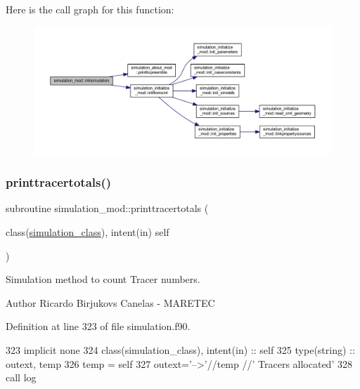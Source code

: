 Here is the call graph for this function\+:
\nopagebreak
\begin{figure}[H]
\begin{center}
\leavevmode
\includegraphics[width=350pt]{namespacesimulation__mod_aedbba2bb458cbcd7eb93938a5f7b5940_cgraph}
\end{center}
\end{figure}
\mbox{\label{namespacesimulation__mod_aba126a8e0575cabb3bef6ab395002b3c}} 
\subsubsection{\texorpdfstring{printtracertotals()}{printtracertotals()}}
{\footnotesize\ttfamily subroutine simulation\+\_\+mod\+::printtracertotals (\begin{DoxyParamCaption}\item[{class(\mbox{\hyperlink{structsimulation__mod_1_1simulation__class}{simulation\+\_\+class}}), intent(in)}]{self }\end{DoxyParamCaption})\hspace{0.3cm}{\ttfamily [private]}}



Simulation method to count Tracer numbers. 

\begin{DoxyAuthor}{Author}
Ricardo Birjukovs Canelas -\/ M\+A\+R\+E\+T\+EC 
\end{DoxyAuthor}


Definition at line 323 of file simulation.\+f90.


\begin{DoxyCode}
323     \textcolor{keywordtype}{implicit none}
324     \textcolor{keywordtype}{class}(simulation\_class), \textcolor{keywordtype}{intent(in)} :: self
325     \textcolor{keywordtype}{type}(string) :: outext, temp
326     temp = self%
327     outext=\textcolor{stringliteral}{'-->'}//temp //\textcolor{stringliteral}{' Tracers allocated'}
328     \textcolor{keyword}{call }log%
\end{DoxyCode}
\mbox{\label{namespacesimulation__mod_a73bd78c4ac76c51f1e10f5847c25c4df}} 
